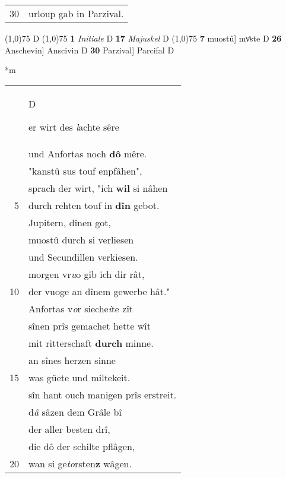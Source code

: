 \documentclass[8pt,a4paper,notitlepage]{article}
\begin{document}
\begin{table}[ht]
\begin{minipage}[t]{0.5\linewidth}
\begin{tabular}{rl}
30 & urloup gab in Parzival.\\ 
\end{tabular}
\scriptsize
\line(1,0){75} \newline
D \newline
\line(1,0){75} \newline
\textbf{1} \textit{Initiale} D  \textbf{17} \textit{Majuskel} D  \newline
\line(1,0){75} \newline
\textbf{7} muostû] mvͦste D \textbf{26} Anschevin] Anscivin D \textbf{30} Parzival] Parcifal D \newline
\end{minipage}
\hspace{0.5cm}
\begin{minipage}[t]{0.5\linewidth}
\small
\begin{center}*m
\end{center}
\begin{tabular}{rl}
 & \begin{large}D\end{large}er wirt des \textit{l}achte sêre\\ 
 & und Anfortas noch \textbf{dô} mêre.\\ 
 & "kanstû sus touf enpfâhen",\\ 
 & sprach der wirt, "ich \textbf{wil} si nâhen\\ 
5 & durch rehten touf in \textbf{dîn} gebot.\\ 
 & Jupitern, dînen got,\\ 
 & muostû durch si verliesen\\ 
 & und Secundillen verkiesen.\\ 
 & morgen vr\textit{u}o gib ich dir rât,\\ 
10 & der vuoge an dînem gewerbe hât."\\ 
 & Anfortas v\textit{o}r sieche\textit{i}te zît\\ 
 & sînen prîs gemachet hette wît\\ 
 & mit ritterschaft \textbf{durch} minne.\\ 
 & an sînes herzen sinne\\ 
15 & was güete und miltekeit.\\ 
 & sîn hant ouch manigen prîs erstreit.\\ 
 & d\textit{â} sâzen dem Grâle bî\\ 
 & der aller besten drî,\\ 
 & die dô der schilte pflâgen,\\ 
20 & wan si ge\textit{to}rsten\textbf{z} wâgen.\\ 

\end{tabular}
\end{minipage}
\end{table}
\end{document}
